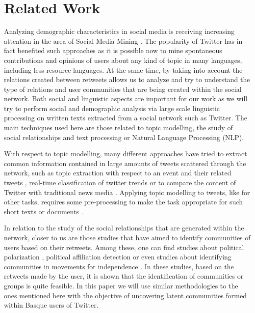 \documentclass[information,article,submit,moreauthors,pdftex,10pt,a4paper]{Definitions/mdpi}
\begin{document}
\section{Related Work}\label{sec:background}

Analyzing demographic characteristics in social media is receiving increasing attention in the area of Social Media Mining \cite{nguyen2016computational,morgan2017predicting}. The popularity of Twitter has in fact benefited such approaches as it is possible now to mine spontaneous contributions and opinions of users about any kind of topic in many languages, including less resource languages. At the same time, by taking into account the relations created between retweets allows us to analyze and try to understand the type of relations and user communities that are being created within the social network. Both social and linguistic aspects are important for our work as we will try to perform social and demographic analysis via large scale linguistic processing on written texts extracted from a social network such as Twitter. The main techniques used here are those related to topic modelling, the study of social relationships and text processing or Natural Language Processing (NLP).

With respect to topic modelling, many different approaches have tried to extract common information contained in large amounts of tweets scattered through the network, such as topic extraction with respect to an event and their related tweets \cite{hu2012lda}, real-time classification of twitter trends \cite{zubiaga2015real} or to compare the content of Twitter with traditional news media \cite{zhao2011comparing}. Applying topic modelling to tweets, like for other tasks, requires some pre-processing to make the task appropriate for such short texts or documents \cite{hong2010empirical}.

In relation to the study of the social relationships that are generated within the network, closer to us are those studies that have aimed to identify communities of users based on their retweets. Among these, one can find studies about political polarization \cite{conover2011political}, political affiliation detection \cite{pennacchiotti2011democrats} or even studies about identifying communities in movements for independence \cite{zubiaga2017stance}. In these studies, based on the retweets made by the user, it is shown that the identification of communities or groups is quite feasible. In this paper we will use similar methodologies to the ones mentioned here with the objective of uncovering latent communities formed within Basque users of Twitter.
\end{document}
